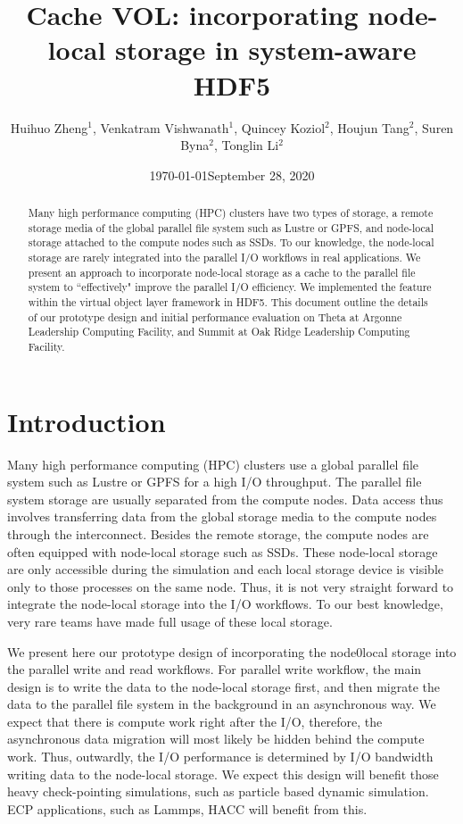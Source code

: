 \documentclass[aps, rmp, 11pt, notitlepage]{revtex4-1}
\begin{document}
\title{Cache VOL: incorporating node-local storage in system-aware HDF5}
\author{Huihuo Zheng$^1$, Venkatram Vishwanath$^1$, Quincey Koziol$^2$, Houjun Tang$^2$, Suren Byna$^2$, Tonglin Li$^2$}
\date{\today}
\date{September 28, 2020}
\begin{abstract}
Many high performance computing (HPC) clusters have two types of storage, a remote storage media of the global parallel file system such as Lustre or GPFS, and node-local storage attached to the compute nodes such as SSDs. 
To our knowledge, the node-local storage are rarely integrated into the parallel I/O workflows in real applications.
We present an approach to incorporate node-local storage as a cache to the parallel file system to ``effectively" improve the parallel I/O efficiency. We implemented the feature within the virtual object layer framework in HDF5. This document outline the details of our prototype design and initial performance evaluation on Theta at Argonne Leadership Computing Facility, and Summit at Oak Ridge Leadership Computing Facility. 
\end{abstract}
\maketitle
\section{Introduction}
\label{sec:intro}
Many high performance computing (HPC) clusters use a global parallel file system such as Lustre or GPFS for a high I/O throughput. The parallel file system storage are usually separated from the compute nodes. Data access thus involves transferring data from the global storage media to the compute nodes through the interconnect. Besides the remote storage, the compute nodes are often equipped with node-local storage such as SSDs. These node-local storage are only accessible during the simulation and each local storage device is visible only to those processes on the same node. Thus, it is not very straight forward to integrate the node-local storage into the I/O workflows. To our best knowledge, very rare teams have made full usage of these local storage. 

We present here our prototype design of incorporating the node0local storage into the parallel write and read workflows. For parallel write workflow, the main design is to write the data to the node-local storage first, and then migrate the data to the parallel file system in the background in an asynchronous way. We expect that there is compute work right after the I/O, therefore, the asynchronous data migration will most likely be hidden behind the compute work. Thus, outwardly, the I/O performance is determined by I/O bandwidth writing data to the node-local storage. We expect this design will benefit those heavy check-pointing simulations, such as particle based dynamic simulation. ECP applications, such as Lammps, HACC will benefit from this.
\end{document}
